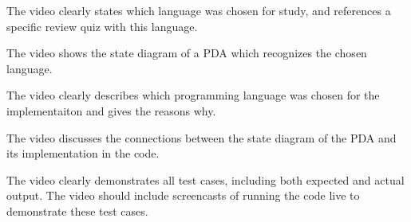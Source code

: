 The video clearly states which language was chosen for study, 
and references a specific review quiz with this language.

The video shows the state diagram of a PDA which recognizes the 
chosen language.

The video clearly describes which programming language was chosen 
for the implementaiton and gives the reasons why.

The video discusses the connections between the state diagram of the PDA 
and its implementation in the code.

The video clearly demonstrates all test cases, including both expected
and actual output. The video should include screencasts of 
running the code live to demonstrate these test cases.

